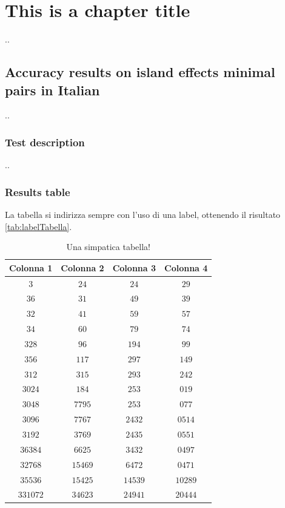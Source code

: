 \chapter{This is a chapter title}

..

\section{Accuracy results on island effects minimal pairs in Italian}

..

\subsection{Test description}

..

\subsection{Results table}


La tabella si indirizza sempre con l'uso di una label, ottenendo il risultato \autoref{tab:labelTabella}.

\begin{table}
	\caption{Una simpatica tabella!}\label{tab:labelTabella}
	\begin{center}
		\begin{tabular}{c|c|c|c}
			\textbf{Colonna 1} & \textbf{Colonna 2} & \textbf{Colonna 3} & \textbf{Colonna 4} \\
			\hline
			$3$      & $24$     & $24$    & $29$ \\ 
			$36$     & $31$     & $49$    & $39$ \\ 
			$32$     & $41$     & $59$    & $57$ \\ 
			$34$     & $60$     & $79$    & $74$ \\ 
			$328$    & $96$     & $194$   & $99$ \\ 
			$356$    & $117$    & $297$   & $149$ \\ 
			$312$    & $315$    & $293$   & $242$ \\ 
			$3024$   & $184$    & $253$   & $019$ \\ 
			$3048$   & $7795$   & $253$   & $077$ \\ 
			$3096$   & $7767$   & $2432$  & $0514$ \\ 
			$3192$   & $3769$   & $2435$  & $0551$ \\ 
			$36384$  & $6625$   & $3432$  & $0497$ \\ 
			$32768$  & $15469$  & $6472$  & $0471$ \\ 
			$35536$  & $15425$  & $14539$ & $10289$ \\ 
			$331072$ & $34623$  & $24941$ & $20444$ \\  
		\end{tabular}
	\end{center}
\end{table}

